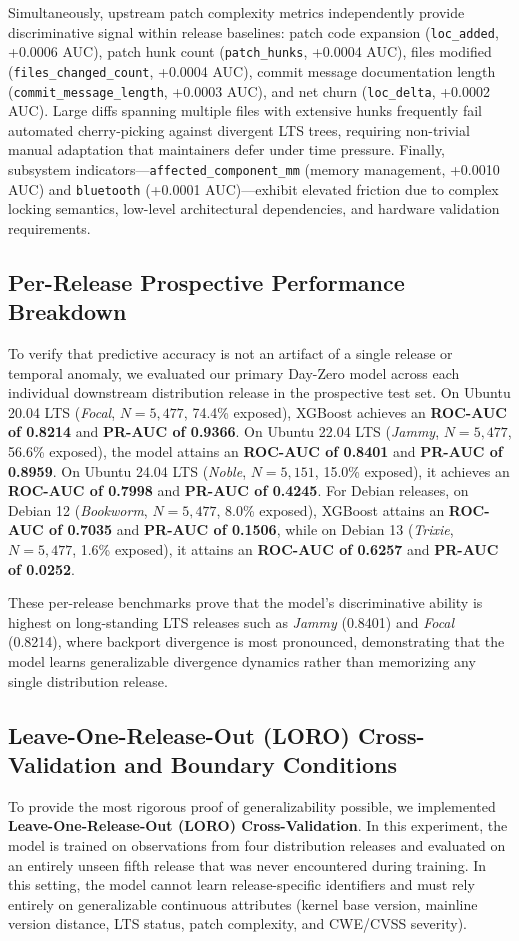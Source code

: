 \documentclass[final,5p,times,twocolumn]{elsarticle}
\begin{document}
Simultaneously, upstream patch complexity metrics independently provide discriminative signal within release baselines: patch code expansion (\texttt{loc\_added}, +0.0006 AUC), patch hunk count (\texttt{patch\_hunks}, +0.0004 AUC), files modified (\texttt{files\_changed\_count}, +0.0004 AUC), commit message documentation length (\texttt{commit\_message\_length}, +0.0003 AUC), and net churn (\texttt{loc\_delta}, +0.0002 AUC). Large diffs spanning multiple files with extensive hunks frequently fail automated cherry-picking against divergent LTS trees, requiring non-trivial manual adaptation that maintainers defer under time pressure. Finally, subsystem indicators---\texttt{affected\_component\_mm} (memory management, +0.0010 AUC) and \texttt{bluetooth} (+0.0001 AUC)---exhibit elevated friction due to complex locking semantics, low-level architectural dependencies, and hardware validation requirements.

\subsection{Per-Release Prospective Performance Breakdown}
To verify that predictive accuracy is not an artifact of a single release or temporal anomaly, we evaluated our primary Day-Zero model across each individual downstream distribution release in the prospective test set. On Ubuntu 20.04 LTS (\textit{Focal}, $N = 5,477$, 74.4\% exposed), XGBoost achieves an \textbf{ROC-AUC of 0.8214} and \textbf{PR-AUC of 0.9366}. On Ubuntu 22.04 LTS (\textit{Jammy}, $N = 5,477$, 56.6\% exposed), the model attains an \textbf{ROC-AUC of 0.8401} and \textbf{PR-AUC of 0.8959}. On Ubuntu 24.04 LTS (\textit{Noble}, $N = 5,151$, 15.0\% exposed), it achieves an \textbf{ROC-AUC of 0.7998} and \textbf{PR-AUC of 0.4245}. For Debian releases, on Debian 12 (\textit{Bookworm}, $N = 5,477$, 8.0\% exposed), XGBoost attains an \textbf{ROC-AUC of 0.7035} and \textbf{PR-AUC of 0.1506}, while on Debian 13 (\textit{Trixie}, $N = 5,477$, 1.6\% exposed), it attains an \textbf{ROC-AUC of 0.6257} and \textbf{PR-AUC of 0.0252}.

These per-release benchmarks prove that the model's discriminative ability is highest on long-standing LTS releases such as \textit{Jammy} (0.8401) and \textit{Focal} (0.8214), where backport divergence is most pronounced, demonstrating that the model learns generalizable divergence dynamics rather than memorizing any single distribution release.

\subsection{Leave-One-Release-Out (LORO) Cross-Validation and Boundary Conditions}
To provide the most rigorous proof of generalizability possible, we implemented \textbf{Leave-One-Release-Out (LORO) Cross-Validation}. In this experiment, the model is trained on observations from four distribution releases and evaluated on an entirely unseen fifth release that was never encountered during training. In this setting, the model cannot learn release-specific identifiers and must rely entirely on generalizable continuous attributes (kernel base version, mainline version distance, LTS status, patch complexity, and CWE/CVSS severity).
\end{document}
